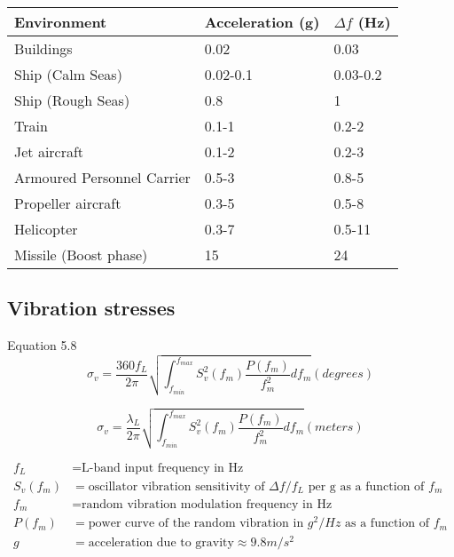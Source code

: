 \begin{table}[!htb]
\centering
\begin{tabular}{|l|l|l|}
\hline
\rowcolor[HTML]{C0C0C0} 
Environment                 & Acceleration (g) & $\Delta f$ (Hz) \\ \hline
Buildings                  & 0.02        &    0.03\\ \hline
\rowcolor[HTML]{EFEFEF} 
Ship (Calm Seas)           & 0.02-0.1    &  0.03-0.2     \\ \hline
Ship (Rough Seas)          & 0.8    &     1          \\ \hline
\rowcolor[HTML]{EFEFEF} 
Train                      & 0.1-1        & 0.2-2              \\ \hline
Jet aircraft               & 0.1-2        & 0.2-3              \\ \hline
\rowcolor[HTML]{EFEFEF} 
Armoured Personnel Carrier & 0.5-3         &  0.8-5             \\ \hline
Propeller aircraft         & 0.3-5         & 0.5-8             \\ \hline
\rowcolor[HTML]{EFEFEF} 
Helicopter                 & 0.3-7         & 0.5-11              \\ \hline
Missile (Boost phase)      & 15          &  24             \\ \hline
\end{tabular}
\caption{\cite{CrystalVibration}}
\label{VibrationLevelsTable}
\end{table}

\subsection{Vibration stresses}
Equation 5.8
\begin{equation}
\sigma_v = \frac{360f_L}{2\pi}\sqrt{\int_{f_{min}}^{f_{max}} S^2_v(f_m) \frac{P(f_m)}{f^2_m} df_m} (degrees)
\end{equation}

\begin{equation}
\sigma_v = \frac{\lambda_L}{2\pi}\sqrt{\int_{f_{min}}^{f_{max}} S^2_v(f_m) \frac{P(f_m)}{f^2_m} df_m} (meters)
\end{equation}

\begin{align*}
f_L &= \text{L-band input frequency in Hz} \\
S_v(f_m) &= \text{oscillator vibration sensitivity of } \Delta f/f_L \text{ per g as a function of } f_m \\
f_m &= \text{random vibration modulation frequency in Hz} \\
P(f_m) &= \text{power curve of the random vibration in }g^2/Hz \text{ as a function of } f_m \\
g &= \text{acceleration due to gravity} \approx 9.8 m/s^2
\end{align*}



